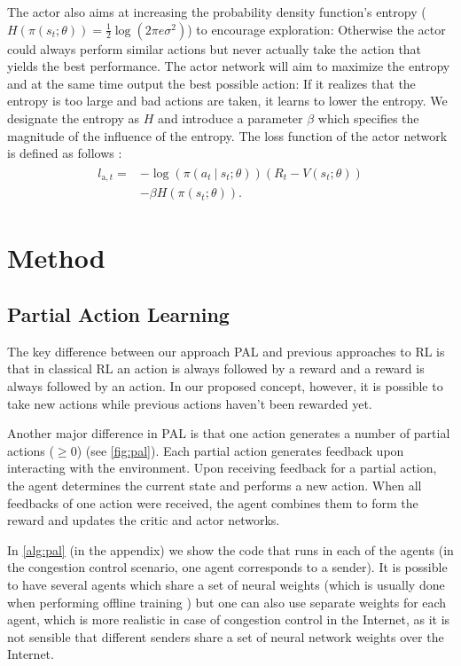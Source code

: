 \documentclass[newfonts=false,format=sigconf,10pt,letterpaper]{acmart}
\newcommand\givenbase[1][]{\:#1\lvert\:}
\let\given\givenbase
\begin{document}
The actor also aims at increasing the probability density function's entropy ($H( \pi( s_t; \theta )) = \frac{1}{2} \log ( 2 \pi e \sigma^2 )$) to encourage exploration: Otherwise the actor could always perform similar actions but never actually take the action that yields the best performance. The actor network will aim to maximize the entropy and at the same time output the best possible action: If it realizes that the entropy is too large and bad actions are taken, it learns to lower the entropy. We designate the entropy as $H$ and introduce a parameter $\beta$ which specifies the magnitude of the influence of the entropy. The loss function of the actor network is defined as follows \cite{mnih_asynchronous_2016}:
\begin{align}
\begin{split}
l_{\text{a},t} =& -\log \left( \pi\left( a_t \given s_t; \theta \right)\right)\left( R_t - V(s_t; \theta) \right)\\ 
&- \beta H\left( \pi\left( s_t; \theta \right)\right).
\end{split}
\end{align}

\section{Method}
\subsection{Partial Action Learning}
\label{subsec:pal}

The key difference between our approach PAL and previous approaches to RL is that in classical RL an action is always followed by a reward and a reward is always followed by an action. In our proposed concept, however, it is possible to take new actions while previous actions haven't been rewarded yet.

Another major difference in PAL is that one action generates a number of partial actions ($\geq 0$) (see \autoref{fig:pal}). Each partial action generates feedback upon interacting with the environment. Upon receiving feedback for a partial action, the agent determines the current state and performs a new action. When all feedbacks of one action were received, the agent combines them to form the reward and updates the critic and actor networks.

In \autoref{alg:pal} (in the appendix) we show the code that runs in each of the agents (in the congestion control scenario, one agent corresponds to a sender). It is possible to have several agents which share a set of neural weights (which is usually done when performing offline training \cite{mnih_asynchronous_2016,mao_neural_2017}) but one can also use separate weights for each agent, which is more realistic in case of congestion control in the Internet, as it is not sensible that different senders share a set of neural network weights over the Internet.
\end{document}
